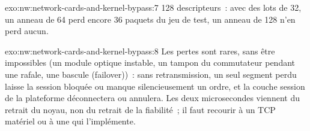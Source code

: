 \begin{solution}{exo:nw:network-cards-and-kernel-bypass:7}
128 descripteurs~: avec des lots de 32, un anneau de 64 perd encore 36 paquets du jeu de test, un anneau de 128 n'en perd aucun.
\end{solution}

\begin{solution}{exo:nw:network-cards-and-kernel-bypass:8}
Les pertes sont rares, sans être impossibles (un module optique instable, un tampon du commutateur pendant une rafale, une bascule (failover))~: sans retransmission, un seul segment perdu
laisse la session bloquée ou manque silencieusement un ordre, et la couche session de la plateforme déconnectera ou annulera. Les deux microsecondes
viennent du retrait du noyau, non du retrait de la fiabilité~; il faut recourir à un TCP matériel ou à une  qui l'implémente.
\end{solution}

